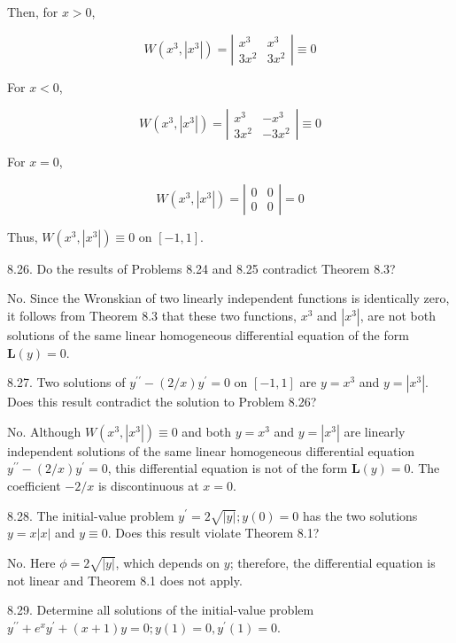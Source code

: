 \documentclass[10pt]{article}
\begin{document}
Then, for $x>0$,

$$
W\left(x^{3},\left|x^{3}\right|\right)=\left|\begin{array}{cc}
x^{3} & x^{3} \\
3 x^{2} & 3 x^{2}
\end{array}\right| \equiv 0
$$

For $x<0$,

$$
W\left(x^{3},\left|x^{3}\right|\right)=\left|\begin{array}{cc}
x^{3} & -x^{3} \\
3 x^{2} & -3 x^{2}
\end{array}\right| \equiv 0
$$

For $x=0$,

$$
W\left(x^{3},\left|x^{3}\right|\right)=\left|\begin{array}{ll}
0 & 0 \\
0 & 0
\end{array}\right|=0
$$

Thus, $W\left(x^{3},\left|x^{3}\right|\right) \equiv 0$ on $[-1,1]$.

8.26. Do the results of Problems 8.24 and 8.25 contradict Theorem 8.3?

No. Since the Wronskian of two linearly independent functions is identically zero, it follows from Theorem 8.3 that these two functions, $x^{3}$ and $\left|x^{3}\right|$, are not both solutions of the same linear homogeneous differential equation of the form $\mathbf{L}(y)=0$.

8.27. Two solutions of $y^{\prime \prime}-(2 / x) y^{\prime}=0$ on $[-1,1]$ are $y=x^{3}$ and $y=\left|x^{3}\right|$. Does this result contradict the solution to Problem 8.26?

No. Although $W\left(x^{3},\left|x^{3}\right|\right) \equiv 0$ and both $y=x^{3}$ and $y=\left|x^{3}\right|$ are linearly independent solutions of the same linear homogeneous differential equation $y^{\prime \prime}-(2 / x) y^{\prime}=0$, this differential equation is not of the form $\mathbf{L}(y)=0$. The coefficient $-2 / x$ is discontinuous at $x=0$.

8.28. The initial-value problem $y^{\prime}=2 \sqrt{|y|} ; y(0)=0$ has the two solutions $y=x|x|$ and $y \equiv 0$. Does this result violate Theorem 8.1?

No. Here $\phi=2 \sqrt{|y|}$, which depends on $y$; therefore, the differential equation is not linear and Theorem 8.1 does not apply.

8.29. Determine all solutions of the initial-value problem $y^{\prime \prime}+e^{x} y^{\prime}+(x+1) y=0 ; y(1)=0, y^{\prime}(1)=0$.
\end{document}
